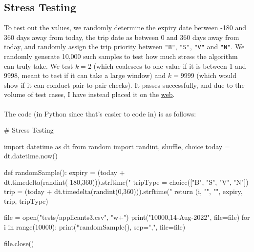 \documentclass{article}
\begin{document}
\subsection{Stress Testing}
To test out the values, we randomly determine the expiry date between -180 and 360 days away from today, the trip date as between 0 and 360 days away from today, and randomly assign the trip priority between \texttt{"B"}, \texttt{"S"}, \texttt{"V"} and \texttt{"N"}. We randomly generate 10,000 such samples to test how much stress the algorithm can truly take. We test $k = 2$ (which coalesces to one value if it is between 1 and 9998, meant to test if it can take a large window) and $k = 9999$ (which would show if it can conduct pair-to-pair checks). It passes successfully, and due to the volume of test cases, I have instead placed it on the \href{https://wormhole.app/xYvnv#KlboJb0ljsMSXtfYUzoVsg}{web}.
\\
\\The code (in Python since that's easier to code in) is as follows:

\begin{python}
# Stress Testing

import datetime as dt
from random import randint, shuffle, choice
today = dt.datetime.now()

def randomSample():
    expiry = (today + dt.timedelta(randint(-180,360))).strftime("%
    tripType = choice(["B", "S", "V", "N"])
    trip = (today + dt.timedelta(randint(0,360))).strftime("%
    return (i, "", "", expiry, trip, tripType)

file = open("tests/applicants3.csv", "w+")
print("10000,14-Aug-2022", file=file)
for i in range(10000):
    print(*randomSample(), sep=",", file=file)

file.close()
\end{python}
\end{document}
